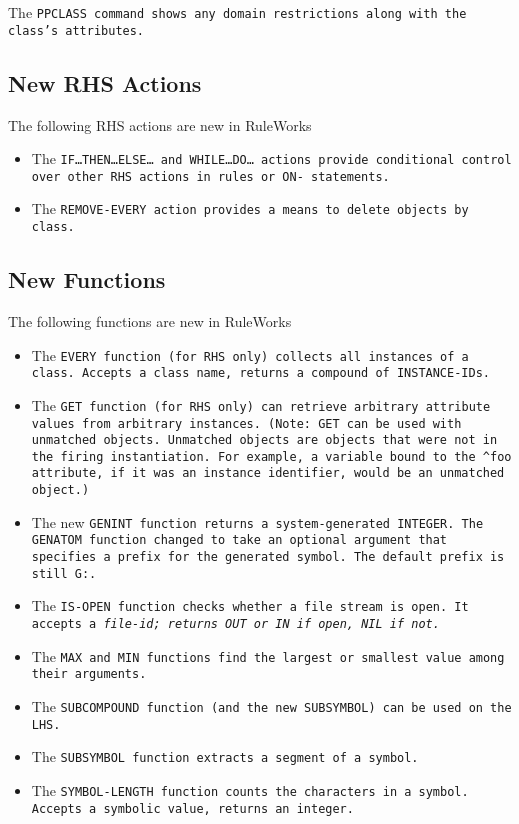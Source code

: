 The \tt{PPCLASS} command shows any domain restrictions along with the
class's attributes.

\subsection{New RHS Actions}

The following RHS actions are new in RuleWorks
\begin{itemize}
\item The \tt{IF}\ldots\tt{THEN}\ldots\tt{ELSE}\ldots{} and
  \tt{WHILE}\ldots\tt{DO}\ldots{} actions provide conditional
  control over other RHS actions in rules or \tt{ON-} statements.
\item The \tt{REMOVE-EVERY} action provides a means to delete objects
  by class.
\end{itemize}
      
\subsection{New Functions}

The following functions are new in RuleWorks
\begin{itemize}
\item The \tt{EVERY} function (for RHS only) collects all instances of
  a class.  Accepts a class name, returns a compound of
  \tt{INSTANCE-ID}s.

\item The \tt{GET} function (for RHS only) can retrieve arbitrary
  attribute values from arbitrary instances. (Note: \tt{GET} can be
  used with unmatched objects. Unmatched objects are objects that were
  not in the firing instantiation. For example, a variable bound to
  the \verb|^foo| attribute, if it was an instance identifier, would
  be an unmatched object.)

\item The new \tt{GENINT} function returns a system-generated
  \tt{INTEGER}. The \tt{GENATOM} function changed to take an optional
  argument that specifies a prefix for the generated symbol. The
  default prefix is still \verb|G:|.

\item The \tt{IS-OPEN} function checks whether a file stream is
  open. It accepts a \it{file-id}; returns \tt{OUT} or \tt{IN} if open, \tt{NIL}
  if not.

\item The \tt{MAX} and \tt{MIN} functions find the largest or smallest
  value among their arguments.

\item The \tt{SUBCOMPOUND} function (and the new \tt{SUBSYMBOL}) can
  be used on the LHS.

\item The \tt{SUBSYMBOL} function extracts a segment of a symbol.

\item The \tt{SYMBOL-LENGTH} function counts the characters in a
  symbol. Accepts a symbolic value, returns an integer.
\end{itemize}
    
